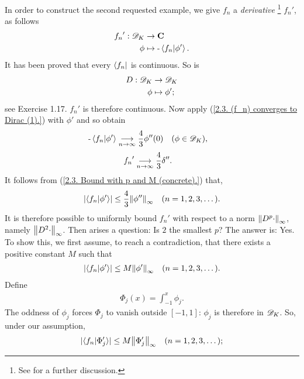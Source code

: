 In order to construct the second requested example, we give %
%
  ${f_n}$ %
%
a \textit{derivative}%
%
  \footnote{
    See  
    for a further discussion.
  } %
${f_n}'$, as follows %
%
  \begin{align}
    {f_n}': {\mathscr D}_K &\to {\mathbf C}\\
                    \phi &\mapsto \text{\small{-}} \bra{f_n}\ket{\phi'}. \nonumber
  \end{align}
%
It has been proved that every $\bra{f_n}$ is continuous. %
So is %
%
  \begin{align}
    D : {\mathscr D}_K & \to {\mathscr D}_K \\
        \phi & \mapsto \phi'; \nonumber
  \end{align}
see  Exercise 1.17. %
${f_n}'$ is therefore continuous. Now apply %
%
  (\ref{2.3. (f_n) converges to Dirac (1).}) %
%
with $\phi'$ and so obtain %
%
  \begin{align}
    \text{\small{-}} \bra{f_n}\ket{\phi'} &\underset{n\to \infty}{\longrightarrow} \frac{4}{3} \phi''(0)
    \quad(\phi \in {\mathscr D}_K), \nonumber
  \end{align}
%
\ie %
%
  \begin{align}
    {f_n}' &\underset{n\to \infty}{\longrightarrow} \frac{4}{3} \delta''. 
  \end{align}
%
It follows from %
%
  (\ref{2.3. Bound with p and M (concrete).}) %
%
that, 
%
  \begin{align}
  \lvert \bra{f_n}\ket{\phi'} \rvert 
    \leq 
  \frac{4}{3} \norm{ \phi''}_{\infty} \quad (n=1, 2, 3, \dots).
  \end{align}
%
It is therefore possible to uniformly bound 
%
  ${f_n}'$ %
%
with respect to a norm %
%
  $\norm{D^p\cdot}_{\infty}$, %
%
namely $\norm{D^2\cdot}_{\infty}$. 
%
Then arises a question: %
%
  Is $2$ the smallest $p$? 
%
The answer is: Yes. 
%
To show this, we first assume, to reach a contradiction, that %
%
  there exists a positive constant $M$ such that
%
  \begin{align}
    \lvert \langle f_n \lvert \phi' \rangle \rvert 
      \leq 
    M \norm{\phi'}_{\infty} 
    \quad (n=1, 2, 3, \dots).
  \end{align}
%
Define %
%
  \begin{align}
    \Phi_{j}(x) = \int_{\minus 1}^x \phi_j.
  \end{align}
%
The oddness of $\phi_j$ forces %
% 
  $\Phi_{j}$ to vanish outside $[\minus 1, 1]$: %
%
$\phi_{j}$ is therefore in ${\mathscr D}_K$. So, under our assumption, 
%
  \begin{align}
    \lvert 
      \langle{f_n}\lvert \Phi_j' \rangle
    \rvert 
      \leq 
    M \norm{\Phi_{j}'}_{\infty}
    \quad (n=1, 2, 3, \dots); 
  \end{align}
